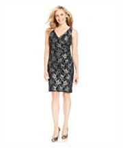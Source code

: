 \documentclass[11pt]{article}
\begin{document}
\begin{figure}
\begin{subfigure}{.18\textwidth}
\label{fig:sub2}
\end{subfigure}
\begin{subfigure}{.18\textwidth}
\centering
\includegraphics[width=\linewidth]{concepts/concept1_pos4.jpg}
\label{fig:sub2}
\end{subfigure}
\begin{subfigure}{.18\textwidth}
\centering

\end{subfigure}
\end{figure}
\end{document}
